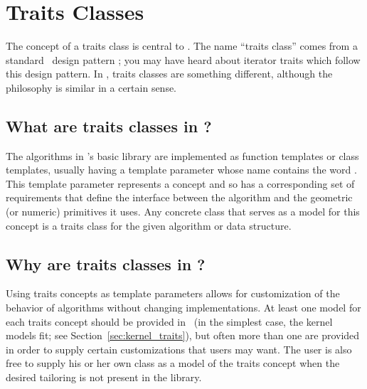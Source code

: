 
\chapter{Traits Classes}
\label{chap:traits_classes}

The concept of a traits class is central to \cgal. The name ``traits
class'' comes from a standard \CC\ design pattern
\cite{cgal:m-tnutt-95}; you may have heard about iterator traits which
follow this design pattern. In \cgal, traits classes are something
different, although the philosophy is similar in a certain sense.

\section{What are traits classes in \cgal?} 
\label{sec:what_is_a_traits_class}

The algorithms in \cgal's basic library are implemented as function templates
or class templates, usually having a template parameter whose name contains
the word .  This template parameter 
represents a concept and so has a corresponding set of requirements that
define the interface between the algorithm and the geometric (or numeric) 
primitives it uses.  Any concrete class that serves as a model for this 
concept is a traits class for the given algorithm or data structure.

\section{Why are traits classes in \cgal?}
\label{sec:why_traits_classes}

Using traits concepts as template parameters allows for customization
of the behavior of algorithms without changing implementations.  At
least one model for each traits concept should be provided in \cgal\ 
(in the simplest case, the kernel models fit; see
Section~\ref{sec:kernel_traits}), but often more than one are provided
in order to supply certain customizations that users may want.  The
user is also free to supply his or her own class as a model of the
traits concept when the desired tailoring is not present in the
library.


